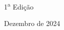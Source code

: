 \begin{center}
  \vspace*{4cm}

  \LARGE 1\textsuperscript{a} Edição

  \bigskip

  \Large Dezembro de 2024
\end{center}